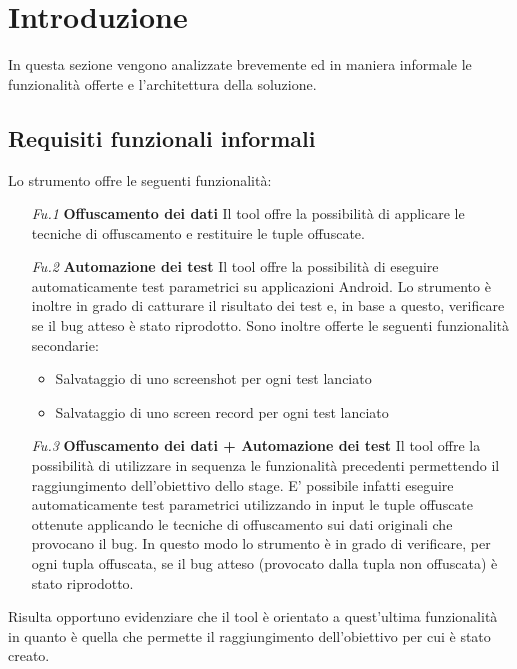 \section{Introduzione}
In questa sezione vengono analizzate brevemente ed in maniera informale le funzionalità offerte e l'architettura della soluzione.
\subsection{Requisiti funzionali informali}
\label{reqinf}
Lo strumento offre le seguenti funzionalità: 
\begin{itemize} [nosep]
\smallskip
\item  [\emph{Fu.1}]\textbf{Offuscamento dei dati} \newline
Il tool offre la possibilità di applicare le tecniche di offuscamento e restituire le tuple offuscate. 

\smallskip
\item  [\emph{Fu.2}]\textbf{Automazione dei test} \newline
Il tool offre la possibilità di eseguire automaticamente test parametrici su applicazioni Android. Lo strumento è inoltre in grado di catturare il risultato dei test e, in base a questo, verificare se il bug atteso è stato riprodotto. Sono inoltre offerte le seguenti funzionalità secondarie:
	\begin{itemize} [nosep]	
			\item Salvataggio di uno screenshot per ogni test lanciato
		\item Salvataggio di uno screen record per ogni test lanciato
	\end{itemize}

\smallskip
\item  [\emph{Fu.3}]\textbf{Offuscamento dei dati + Automazione dei test} \newline
Il tool offre la possibilità di utilizzare in sequenza le funzionalità precedenti permettendo il raggiungimento dell'obiettivo dello stage. E' possibile infatti eseguire automaticamente test parametrici utilizzando in input le tuple offuscate ottenute applicando le tecniche di offuscamento sui dati originali che provocano il bug. In questo modo lo strumento è in grado di verificare, per ogni tupla offuscata, se il bug atteso (provocato dalla tupla non offuscata) è stato riprodotto.
\end{itemize}  

\noindent Risulta opportuno evidenziare che il tool è orientato a quest'ultima funzionalità  in quanto è quella che permette il raggiungimento dell'obiettivo per cui è stato creato.  


